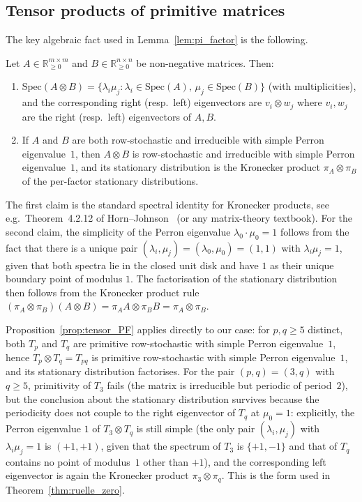 \subsection{Tensor products of primitive matrices}
\label{appssec:tensor_primitive}

The key algebraic fact used in Lemma~\ref{lem:pi_factor} is the
following.

\begin{proposition}
\label{prop:tensor_PF}
Let $A \in \mathbb{R}_{\geq 0}^{m \times m}$ and
$B \in \mathbb{R}_{\geq 0}^{n \times n}$ be non-negative matrices.
Then:
\begin{enumerate}[itemsep=2pt]
  \item $\mathrm{Spec}(A \otimes B) = \{\lambda_i \mu_j : \lambda_i
    \in \mathrm{Spec}(A),\, \mu_j \in \mathrm{Spec}(B)\}$ (with
    multiplicities), and the corresponding right (resp.\ left)
    eigenvectors are $v_i \otimes w_j$ where $v_i, w_j$ are the
    right (resp.\ left) eigenvectors of $A, B$.
  \item If $A$ and $B$ are both row-stochastic and irreducible
    with simple Perron eigenvalue~$1$, then $A \otimes B$ is
    row-stochastic and irreducible with simple Perron
    eigenvalue~$1$, and its stationary distribution is the
    Kronecker product $\pi_A \otimes \pi_B$ of the per-factor
    stationary distributions.
\end{enumerate}
\end{proposition}

The first claim is the standard spectral identity for Kronecker
products, see e.g.\ Theorem~4.2.12 of Horn--Johnson~\cite{Seneta2006}
(or any matrix-theory textbook). For the second claim, the simplicity
of the Perron eigenvalue $\lambda_0 \cdot \mu_0 = 1$ follows from the
fact that there is a unique pair
$(\lambda_i, \mu_j) = (\lambda_0, \mu_0) = (1, 1)$ with
$\lambda_i \mu_j = 1$, given that both spectra lie in the closed
unit disk and have $1$ as their unique boundary point of modulus
$1$. The factorisation of the stationary distribution then follows
from the Kronecker product rule
$(\pi_A \otimes \pi_B)(A \otimes B) = \pi_A A \otimes \pi_B B =
\pi_A \otimes \pi_B$.

Proposition~\ref{prop:tensor_PF} applies directly to our case: for
$p, q \geq 5$ distinct, both $T_p$ and $T_q$ are primitive
row-stochastic with simple Perron eigenvalue~$1$, hence
$T_p \otimes T_q = T_{pq}$ is primitive row-stochastic with simple
Perron eigenvalue~$1$, and its stationary distribution factorises.
For the pair $(p, q) = (3, q)$ with $q \geq 5$, primitivity of
$T_3$ fails (the matrix is irreducible but periodic of period~$2$),
but the conclusion about the stationary distribution survives
because the periodicity does not couple to the right eigenvector
of $T_q$ at $\mu_0 = 1$: explicitly, the Perron eigenvalue $1$ of
$T_3 \otimes T_q$ is still simple (the only pair $(\lambda_i, \mu_j)$
with $\lambda_i \mu_j = 1$ is $(+1, +1)$, given that the spectrum
of $T_3$ is $\{+1, -1\}$ and that of $T_q$ contains no point of
modulus~$1$ other than $+1$), and the corresponding left
eigenvector is again the Kronecker product
$\pi_3 \otimes \pi_q$. This is the form used in
Theorem~\ref{thm:ruelle_zero}.

